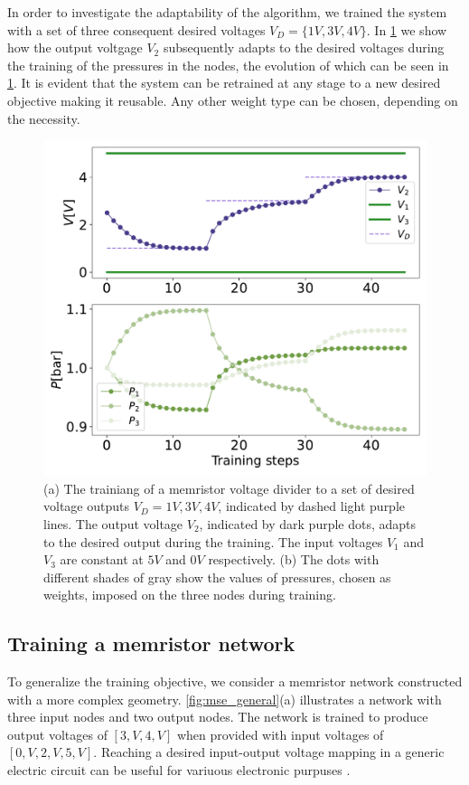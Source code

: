 \documentclass[reprint,superscriptaddress,prb,showkeys]{revtex4-2}
\begin{document}
In order to investigate the adaptability of the algorithm, we trained the system with a set of three consequent desired voltages $V_D=\{1V, 3V, 4V\}$. In \cref{fig:evolution_targets} we show how the output voltgage $V_2$ subsequently adapts to the desired voltages during the training of the pressures in the nodes, the evolution of which can be seen in \cref{fig:evolution_targets}. It is evident that the system can be retrained at any stage to a new desired objective making it reusable. Any other weight type can be chosen, depending on the necessity.  

\begin{figure}[h]
    \centering
    \includegraphics[width=0.8\columnwidth]{plots/voltage_divider/evolution_targets.pdf}
    \caption{(a) The trainiang of a memristor voltage divider to a set of desired voltage outputs $V_D = {1V, 3V, 4V}$, indicated by dashed light purple lines. The output voltage $V_2$, indicated by dark purple dots, adapts to the desired output during the training. The input voltages $V_1$ and $V_3$ are constant at $5V$ and $0V$ respectively. (b) The dots with different shades of gray show the values of pressures, chosen as weights, imposed on the three nodes during training.}\label{fig:evolution_targets}
\end{figure}

\subsection{Training a memristor network}

To generalize the training objective, we consider a memristor network constructed with a more complex geometry. \cref{fig:mse_general}(a) illustrates a network with three input nodes and two output nodes. The network is trained to produce output voltages of $[3,V, 4,V]$ when provided with input voltages of $[0,V, 2,V, 5,V]$.  Reaching a desired input-output voltage mapping in a generic electric circuit can be useful for variuous electronic purpuses \cite{voltage_controlled_oscillator, onchip_powerdistributed}. 
\end{document}
